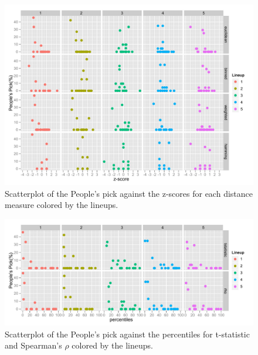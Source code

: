 \documentclass{beamer}
\begin{document}
\begin{frame}
\begin{figure}[htbp]
\centering
\includegraphics[scale=0.45]{dist_vs_zscore.pdf}
\caption{Scatterplot of the People's pick against the z-scores for each distance measure colored by the lineups. }
\end{figure}


\end{frame}

\begin{frame}
\begin{figure}[htbp]
\centering
\includegraphics[scale=0.45]{dist_vs_percentile.pdf}
\caption{Scatterplot of the People's pick against the percentiles for t-statistic and Spearman's $\rho$ colored by the lineups. }
\end{figure}


\end{frame}
\end{document}
